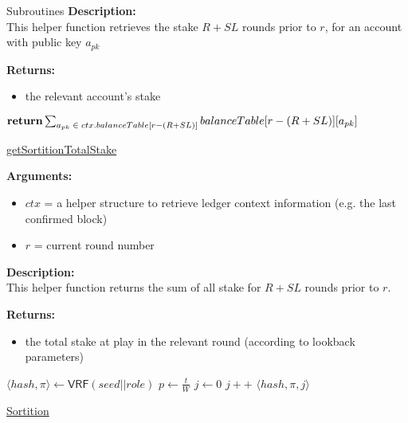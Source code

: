 \documentclass[10pt,a4paper]{article}
\begin{document}
\begin{section}{Subroutines}
\noindent \textbf{Description:}\\
This helper function retrieves the stake $R + SL$ rounds prior to $r$, for an account
with public key $a_{pk}$

\noindent \textbf{Returns:}
\begin{itemize}
    \item the relevant account's stake
  \end{itemize}




\begin{algorithm}[H]
    \begin{algorithmic}[H]
        
        $\Return \sum_{a_{pk}\;\in\;ctx.balanceTable[r - (R + SL)]}{balanceTable[r - (R + SL)][a_{pk}]}$

        \EndFunction
    \end{algorithmic}
    \caption{\underline{getSortitionTotalStake}}
\end{algorithm}

\noindent \textbf{Arguments:}
\begin{itemize}
    \item $ctx$ = a helper structure to retrieve ledger context information (e.g. the last confirmed block)
    \item $r$ = current round number
  \end{itemize}


\noindent \textbf{Description:}\\
This helper function returns the sum of all stake for $R + SL$ rounds prior to $r$.

\noindent \textbf{Returns:}
\begin{itemize}
    \item the total stake at play in the relevant round (according to lookback parameters)
  \end{itemize}


\begin{algorithm}[H]
    \begin{algorithmic}[H]
        \State $ \langle hash, \pi \rangle \gets \mathsf{VRF}(seed||role)$
        \State $p \gets \frac{t}{W}$
        \State $j \gets 0$
        \While{$\frac{hash}{2^{hashlen}}\notin [ \sum_{k=0}^j\mathsf{B}(k;w,p), \sum_{k=0}^{j+1}\mathsf{B}(k;w,p))$}
            \State $j++$
        \EndWhile
        \Return $ \langle hash,\pi,j \rangle$
    \EndFunction
    \end{algorithmic}
    \caption{\underline{Sortition}}
\end{algorithm}



\end{section}
\end{document}
